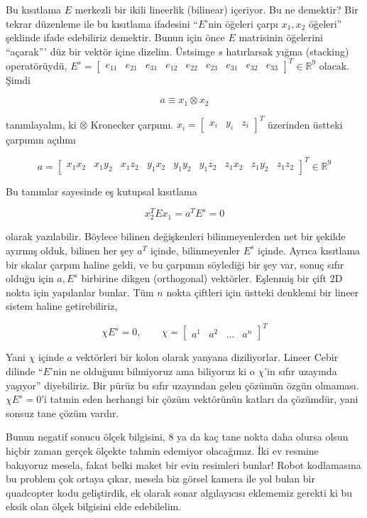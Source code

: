 \documentclass[12pt,fleqn]{article}\usepackage{../../common}
\begin{document}
Bu kısıtlama $E$ merkezli bir ikili lineerlik (bilinear) içeriyor. Bu ne
demektir? Bir tekrar düzenleme ile bu kısıtlama ifadesini ``$E$'nin öğeleri
çarpı $x_1,x_2$ öğeleri'' şeklinde ifade edebiliriz demektir. Bunun için önce
$E$ matrisinin öğelerini ``açarak''' düz bir vektör içine dizelim. Üstsimge $s$
hatırlarsak yığma (stacking) operatörüydü, $E^s =\left[\begin{array}{ccccccccc}
  e_{11} & e_{21} & e_{31} & e_{12} & e_{22} & e_{23} & e_{31} & e_{32} &
  e_{33} \end{array}\right]^T \in \mathbb{R}^9 $ olacak. Şimdi

$$ a \equiv x_1 \otimes x_2 $$

tanımlayalım, ki $\otimes$ Kronecker çarpımı. $x_i = \left[\begin{array}{ccc}
    x_i & y_i & z_i \end{array}\right]^T$ üzerinden üstteki çarpımın açılımı

$$ a = \left[\begin{array}{ccccccccc} 
x_1x_2 & 
x_1y_2 & 
x_1z_2 & 
y_1x_2 & 
y_1y_2 & 
y_1z_2 & 
z_1x_2 & 
z_1y_2 & 
z_1z_2 
\end{array}\right]^T \in \mathbb{R}^9 $$

Bu tanımlar sayesinde eş kutupsal kısıtlama

$$ x_2^TEx_1 = a^TE^s = 0 $$

olarak yazılabilir. Böylece bilinen değişkenleri bilinmeyenlerden net bir
şekilde ayırmış olduk, bilinen her şey $a^T$ içinde, bilinmeyenler $E^s$
içinde. Ayrıca kısıtlama bir skalar çarpım haline geldi, ve bu çarpımın
söylediği bir şey var, sonuç sıfır olduğu için $a,E^s$ birbirine dikgen
(orthogonal) vektörler. Eşlenmiş bir çift 2D nokta için yapılanlar bunlar. Tüm
$n$ nokta çiftleri için üstteki denklemi bir lineer sistem haline getirebiliriz,

$$
\chi E^s = 0, \qquad \chi =
\left[\begin{array}{cccc} a^1 & a^2 & \dots & a^n \end{array}\right]^T
$$

Yani $\chi$ içinde $a$ vektörleri bir kolon olarak yanyana diziliyorlar. Lineer
Cebir dilinde ``$E$'nin ne olduğunu bilmiyoruz ama biliyoruz ki o $\chi$'in
sıfır uzayında yaşıyor'' diyebiliriz. Bir pürüz bu sıfır uzayından gelen çözümün
özgün olmaması.  $\chi E^s = 0$'i tatmin eden herhangi bir çözüm vektörünün
katları da çözümdür, yani sonsuz tane çözüm vardır.

Bunun negatif sonucu ölçek bilgisini, 8 ya da kaç tane nokta daha olursa olsun
hiçbir zaman gerçek ölçekte tahmin edemiyor olacağımız. İki ev resmine bakıyoruz
mesela, fakat belki maket bir evin resimleri bunlar!  Robot kodlamasına bu
problem çok ortaya çıkar, mesela biz görsel kamera ile yol bulan bir quadcopter
kodu geliştirdik, ek olarak sonar algılayıcısı eklememiz gerekti ki bu eksik
olan ölçek bilgisini elde edebilelim.
\end{document}
